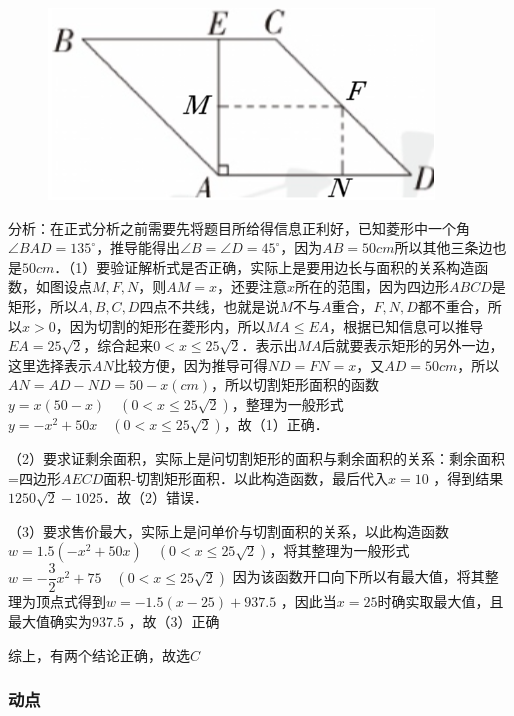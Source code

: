 {}{
\begin{figure}
\includegraphics[width=1\linewidth]{figure/p3-1.png}
    \label{fig:p3_1}
    \caption{}
\end{figure}
分析：在正式分析之前需要先将题目所给得信息正利好，已知菱形中一个角\(\angle BAD=135^\circ\)，推导能得出\(\angle B= \angle D=45^\circ\)，因为\(AB=50cm\)所以其他三条边也是\(50cm\)．（1）要验证解析式是否正确，实际上是要用边长与面积的关系构造函数，如图设点\(M,F,N\)，则\(AM=x\)，还要注意\(x\)所在的范围，因为四边形\(ABCD\)是矩形，所以\(A,B,C,D\)四点不共线，也就是说\(M\)不与\(A\)重合，\(F,N,D\)都不重合，所以\(x>0\)，因为切割的矩形在菱形内，所以\(MA\le EA\)，根据已知信息可以推导\(EA=25\sqrt{2}\)，综合起来\(0<x\le25\sqrt{2}\)．表示出\(MA\)后就要表示矩形的另外一边，这里选择表示\(AN\)比较方便，因为推导可得\(ND=FN=x\)，又\(AD=50cm\)，所以\(AN=AD-ND=50-x(cm)\)，所以切割矩形面积的函数\(y=x(50-x)\quad(0<x\le25\sqrt{2})\)，整理为一般形式\(y=-x^2+50x\quad(0<x\le25\sqrt{2})\)，故（1）正确．

（2）要求证剩余面积，实际上是问切割矩形的面积与剩余面积的关系：剩余面积=四边形\(AECD\)面积-切割矩形面积．以此构造函数，最后代入\(x=10\) ，得到结果\(1250\sqrt{2}-1025\)．故（2）错误．

（3）要求售价最大，实际上是问单价与切割面积的关系，以此构造函数\(w=1.5(-x^2+50x)\quad (0<x\le25\sqrt{2})\)，将其整理为一般形式\(w=-\dfrac{3}{2}x^2+75\quad (0<x\le25\sqrt{2})\) 因为该函数开口向下所以有最大值，将其整理为顶点式得到\(w=-1.5(x-25)+937.5\) ，因此当\(x=25\)时确实取最大值，且最大值确实为\(937.5\) ，故（3）正确

综上，有两个结论正确，故选\(C\)
}

\subsubsection*{动点}


